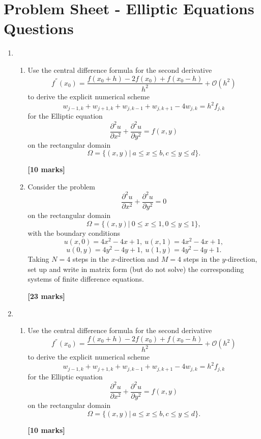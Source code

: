 \section{Problem Sheet - Elliptic Equations Questions}
\begin{enumerate}
\item
	\begin{enumerate}
	
\item 
Use the central difference formula for the second derivative 
\[ f^{''}(x_0)=\frac{f(x_0+h)-2f(x_0)+f(x_0-h)}{h^2}+\mathcal{O}(h^2)\]
to derive the explicit numerical scheme
\[w_{j-1,k}+w_{j+1,k}+w_{j,k-1}+w_{j,k+1}-4w_{j,k}=h^2f_{j,k}\]
for the Elliptic equation 
\[\frac{\partial^2 u}{\partial x^2}+\frac{\partial^2 u}{\partial y^2}=f(x,y) \]
on the rectangular domain
\[\Omega=\{(x,y)| \ a\leq x \leq b, c \leq y \leq d\}. \]
\begin{flushright}
\textbf{[10 marks]}
\end{flushright}
	
\item Consider the problem
\[\frac{\partial^2 u}{\partial x^2}+\frac{\partial^2 u}{\partial y^2}=0 \]
on the rectangular domain
\[\Omega=\{(x,y)| \ 0\leq x \leq 1, 0 \leq y \leq 1\}, \]
with the boundary conditions
\[ u(x,0)=4x^2-4x+1, \ u(x,1)=4x^2-4x+1, \] \[ u(0,y)=4y^2-4y+1, \ u(1,y)=4y^2-4y+1.   \]
Taking $N=4$ steps in the $x$-direction and $M=4$ steps in the $y$-direction, set up and write in matrix form (but do not solve) the corresponding systems of finite difference equations.
\begin{flushright}
\textbf{[23 marks]}
\end{flushright}
		
\end{enumerate}
\newpage
\item
	\begin{enumerate}
	
\item 
Use the central difference formula for the second derivative 
\[ f^{''}(x_0)=\frac{f(x_0+h)-2f(x_0)+f(x_0-h)}{h^2}+\mathcal{O}(h^2)\]
to derive the explicit numerical scheme
\[w_{j-1,k}+w_{j+1,k}+w_{j,k-1}+w_{j,k+1}-4w_{j,k}=h^2f_{j,k}\]
for the Elliptic equation 
\[\frac{\partial^2 u}{\partial x^2}+\frac{\partial^2 u}{\partial y^2}=f(x,y) \]
on the rectangular domain
\[\Omega=\{(x,y)| \ a\leq x \leq b, c \leq y \leq d\}. \]
\begin{flushright}
\textbf{[10 marks]}
\end{flushright}
	

\end{enumerate}
\end{enumerate}
